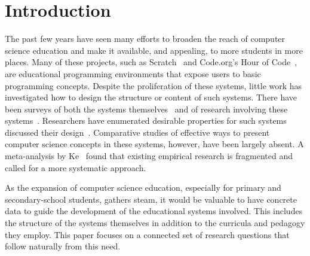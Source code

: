 \documentclass{sig-alternate}
\begin{document}
\section{Introduction}
The past few years have seen many efforts to broaden the reach of computer science education and make it available, and appealing, to more students in more places. 
Many of these projects, such as Scratch~\cite{scratch} and Code.org's Hour of Code~\cite{codedotorg}, are educational programming environments that expose users to basic programming concepts. 
Despite the proliferation of these systems, little work has investigated how to design the structure or content of such systems. There have been surveys of both the systems themselves~\cite{guzdial2004programming, kelleher2005lowering} and of research involving these systems~\cite{salleh2013analysis, backlund2013educational}. Researchers have enumerated desirable properties for such systems~\cite{repenning2010scalable} discussed their design~\cite{powers2006tools}.
Comparative studies of effective ways to present computer science concepts in these systems, however, have been largely absent. A meta-analysis by Ke~\cite{ke2009qualitative} found that existing empirical research is fragmented and called for a more systematic approach.

As the expansion of computer science education, especially for primary and secondary-school students, gathers steam, it would be valuable to have concrete data to guide the development of the educational systems involved. 
This includes the structure of the systems themselves in addition to the curricula and pedagogy they employ. 
This paper focuses on a connected set of research questions that follow naturally from this need.

\end{document}
